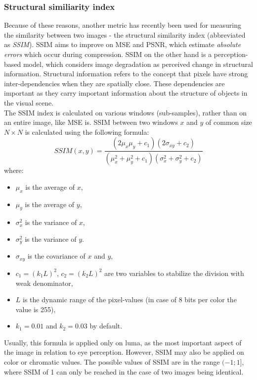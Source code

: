 \documentclass[thesis=M,english]{FITthesis}[2012/10/20]
\begin{document}
\subsubsection{Structural similiarity index}
Because of these reasons, another metric has recently been used for measuring the
similarity between two images - the structural similarity index (abbreviated as
\emph{SSIM}). SSIM aims to improve on MSE and PSNR, which estimate \emph{absolute
errors} which occur during compression. SSIM on the other hand is a perception-based
model, which considers image degradation as perceived change in structural information.
Structural information refers to the concept that pixels have strong inter-dependencies
when they are spatially close. These dependencies are important as they carry important
information about the structure of objects in the visual scene.
\\

The SSIM index is calculated on various windows (sub-samples), rather than on an entire
image, like MSE is. SSIM between two windows $x$ and $y$ of common size $N \times N$ is
calculated using the following formula:
\begin{equation}
  SSIM(x, y) = \frac{(2\mu_{x}\mu_{y}+c_{1})(2\sigma_{xy} + c_{2})}{(\mu^{2}_{x} + \mu^{2}_{y} + c_{1})(\sigma^{2}_{x} + \sigma^{2}_{y} + c_2)}
\end{equation}
where:
\begin{itemize}
  \item $\mu_{x}$ is the average of $x$,
  \item $\mu_{y}$ is the average of $y$,
  \item $\sigma^{2}_{x}$ is the variance of $x$,
  \item $\sigma^{2}_{y}$ is the variance of $y$.
  \item $\sigma_{xy}$ is the covariance of $x$ and $y$,
  \item $c_1 = (k_1 L)^{2}$, $c_2 = (k_2 L)^{2}$ are two variables to stabilize
  the division with weak denominator,
  \item $L$ is the dynamic range of the pixel-values (in case of 8 bits per color the value is 255),
  \item $k_1 = 0.01$ and $k_2 = 0.03$ by default.
\end{itemize}\cite{ssim}

Usually, this formula is applied only on luma, as the most important aspect of the
image in relation to eye perception. However, SSIM may also be applied on color or
chromatic values. The possible values of SSIM are in the range $(-1; 1]$, where 
SSIM of 1 can only be reached in the case of two images being identical.
\\
\end{document}
